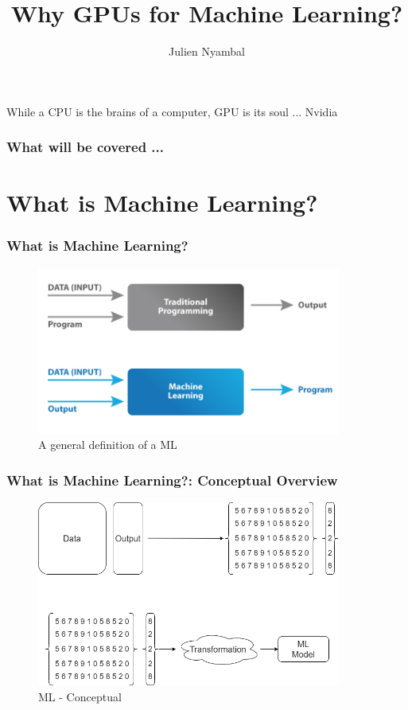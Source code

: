 \documentclass[11pt]{beamer}
\begin{document}
	\author{Julien Nyambal}
	\title{Why GPUs for Machine Learning?}
	\begin{frame}[plain]
		\maketitle
	\end{frame}

\begin{frame}
	\centering
	While a CPU is the brains of a computer, GPU is its soul ... Nvidia
\end{frame}

	\begin{frame}
		\frametitle{What will be covered ...}
		\tableofcontents
	\end{frame}

\section{What is Machine Learning?}
\begin{frame}
	\frametitle{What is Machine Learning?}
	\begin{figure}
		\includegraphics[width=100mm,scale=0.7]{ml}
		\caption{A general definition of a ML}
	\end{figure}
\end{frame}

\begin{frame}
	\frametitle{What is Machine Learning?: Conceptual Overview}
	\begin{figure}
	\includegraphics[width=100mm,scale=0.7]{ml_concept}
	\caption{ML - Conceptual}
\end{figure}
\end{frame}
\end{document}
